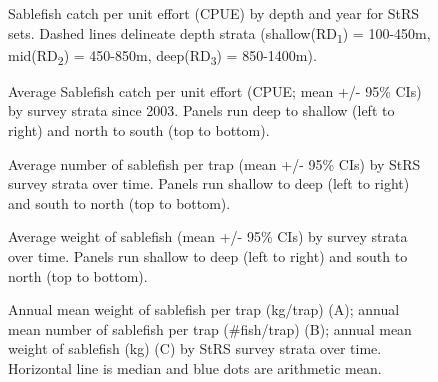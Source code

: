 \documentclass[12pt]{article}\usepackage[]{graphicx}\usepackage[]{color}
\begin{document}
\begin{figure}[htb]

{\centering {} 

}

\caption{Sablefish catch per unit effort (CPUE) by depth and year for StRS sets. Dashed lines delineate depth strata (shallow(RD\textsubscript{1}) = 100-450m, mid(RD\textsubscript{2}) = 450-850m, deep(RD\textsubscript{3}) = 850-1400m).}\label{fig:figure5}
\end{figure}
\clearpage


\begin{figure}[htb]

{\centering {} 

}

\caption{Average Sablefish catch per unit effort (CPUE; mean +/- 95\% CIs) by survey strata since 2003. Panels run deep to shallow (left to right) and north to south (top to bottom).}\label{fig:figure6}
\end{figure}
\clearpage


\begin{figure}[htb]

{\centering {} 

}

\caption{Average number of sablefish per trap (mean +/- 95\% CIs) by StRS survey strata over time. Panels run shallow to deep (left to right) and south to north (top to bottom).}\label{fig:figure7}
\end{figure}
\clearpage


\begin{figure}[htb]

{\centering {} 

}

\caption{Average weight of sablefish (mean +/- 95\% CIs) by survey strata over time. Panels run shallow to deep (left to right) and south to north (top to bottom).}\label{fig:figure8}
\end{figure}
\clearpage


\begin{figure}[htb]

{\centering {} 

}

\caption{Annual mean weight of sablefish per trap (kg/trap) (A); annual mean number of sablefish per trap (\#fish/trap) (B); annual mean weight of sablefish (kg) (C) by StRS survey strata over time. Horizontal line is median and blue dots are arithmetic mean.}\label{fig:figure9}
\end{figure}
\clearpage
\end{document}
